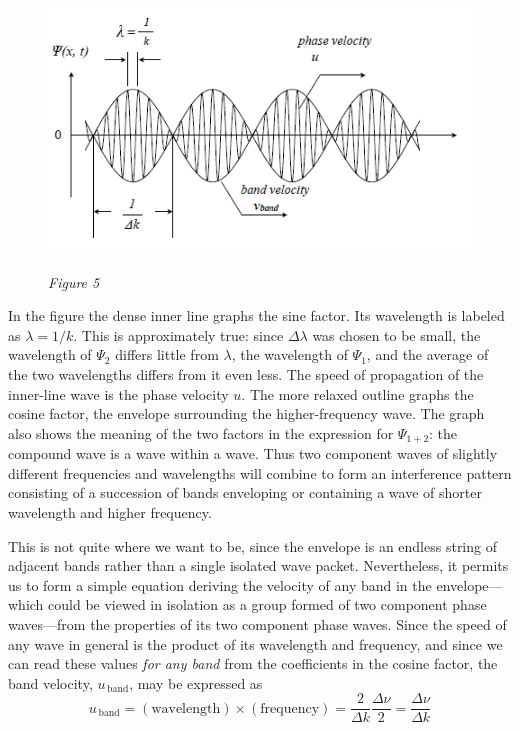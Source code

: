 \begin{figure}[h] %
\centering
    \includegraphics[width=4.90625in,height=2.85417in]{images/08_debroglie/image036.png}
    \caption*{\emph{Figure 5}}
\end{figure}

In the figure the dense inner line graphs the sine factor. Its wavelength is
labeled as $\lambda = 1/k$. This is approximately true: since
$\Delta\lambda$ was chosen to be small, the wavelength of $\Psi_2$ differs
little from $\lambda$, the wavelength of $\Psi_1$, and the average of
the two wavelengths differs from it even less. The speed of propagation
of the inner-line wave is the phase velocity $u$. The more relaxed
outline graphs the cosine factor, the envelope surrounding the
higher-frequency wave. The graph also shows the meaning of the two factors in
the expression for $\Psi_{1+2}$: the compound wave is a wave within a
wave. Thus two component waves of slightly different frequencies and
wavelengths will combine to form an interference pattern consisting of a
succession of bands enveloping or containing a wave of shorter
wavelength and higher frequency.

This is not quite where we want to be, since the envelope is an endless
string of adjacent bands rather than a single isolated wave packet.
Nevertheless, it permits us to form a simple equation deriving the
velocity of any band in the envelope---which could be viewed in
isolation as a group formed of two component phase waves---from the
properties of its two component phase waves. Since the speed of any wave
in general is the product of its wavelength and frequency, and since we
can read these values \emph{for any band} from the coefficients in the
cosine factor, the band velocity, $u_{\,\text{band}}$, may be
expressed as
\begin{equation*}\tag{2}
u_{\,\textrm{band}} = (\text{wavelength})\times (\text{frequency}) = \frac{2}{\Delta k}\frac{\Delta\nu}{2} = 
\frac{\Delta\nu}{\Delta k}
\end{equation*}

